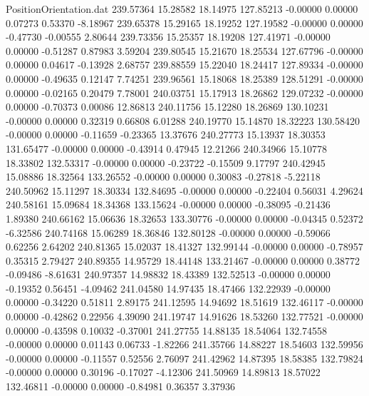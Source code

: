 \begin{filecontents}{PositionOrientation.dat}
 239.57364   15.28582   18.14975   127.85213   -0.00000    0.00000    0.07273    0.53370   -8.18967
 239.65378   15.29165   18.19252   127.19582   -0.00000    0.00000   -0.47730   -0.00555    2.80644
 239.73356   15.25357   18.19208   127.41971   -0.00000    0.00000   -0.51287    0.87983    3.59204
 239.80545   15.21670   18.25534   127.67796   -0.00000    0.00000    0.04617   -0.13928    2.68757
 239.88559   15.22040   18.24417   127.89334   -0.00000    0.00000   -0.49635    0.12147    7.74251
 239.96561   15.18068   18.25389   128.51291   -0.00000    0.00000   -0.02165    0.20479    7.78001
 240.03751   15.17913   18.26862   129.07232   -0.00000    0.00000   -0.70373    0.00086   12.86813
 240.11756   15.12280   18.26869   130.10231   -0.00000    0.00000    0.32319    0.66808    6.01288
 240.19770   15.14870   18.32223   130.58420   -0.00000    0.00000   -0.11659   -0.23365   13.37676
 240.27773   15.13937   18.30353   131.65477   -0.00000    0.00000   -0.43914    0.47945   12.21266
 240.34966   15.10778   18.33802   132.53317   -0.00000    0.00000   -0.23722   -0.15509    9.17797
 240.42945   15.08886   18.32564   133.26552   -0.00000    0.00000    0.30083   -0.27818   -5.22118
 240.50962   15.11297   18.30334   132.84695   -0.00000    0.00000   -0.22404    0.56031    4.29624
 240.58161   15.09684   18.34368   133.15624   -0.00000    0.00000   -0.38095   -0.21436    1.89380
 240.66162   15.06636   18.32653   133.30776   -0.00000    0.00000   -0.04345    0.52372   -6.32586
 240.74168   15.06289   18.36846   132.80128   -0.00000    0.00000   -0.59066    0.62256    2.64202
 240.81365   15.02037   18.41327   132.99144   -0.00000    0.00000   -0.78957    0.35315    2.79427
 240.89355   14.95729   18.44148   133.21467   -0.00000    0.00000    0.38772   -0.09486   -8.61631
 240.97357   14.98832   18.43389   132.52513   -0.00000    0.00000   -0.19352    0.56451   -4.09462
 241.04580   14.97435   18.47466   132.22939   -0.00000    0.00000   -0.34220    0.51811    2.89175
 241.12595   14.94692   18.51619   132.46117   -0.00000    0.00000   -0.42862    0.22956    4.39090
 241.19747   14.91626   18.53260   132.77521   -0.00000    0.00000   -0.43598    0.10032   -0.37001
 241.27755   14.88135   18.54064   132.74558   -0.00000    0.00000    0.01143    0.06733   -1.82266
 241.35766   14.88227   18.54603   132.59956   -0.00000    0.00000   -0.11557    0.52556    2.76097
 241.42962   14.87395   18.58385   132.79824   -0.00000    0.00000    0.30196   -0.17027   -4.12306
 241.50969   14.89813   18.57022   132.46811   -0.00000    0.00000   -0.84981    0.36357    3.37936

\end{filecontents}

